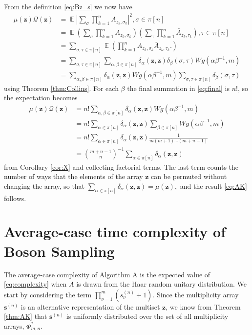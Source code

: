 \documentclass[a4paper,11pt]{article}
\newcommand{\EX}{\mathop{{}\mathbb{E}}}
\def\BS/{Boson Sampling}
\begin{document}
From the definition \eqref{eq:Bz_s} we now have
\begin{align}
	\mu(\mathbf{z}) \mathcal{Q}(\mathbf{z})
	&= \EX \left| \sum_{\sigma} \prod_{k=1}^n A_{z_k,\sigma_k}\right|^2, \sigma \in \pi[n] \nonumber\\
	&= \EX \left(\sum_\sigma \prod_{k=1}^n A_{z_k,\sigma_k }\right)\left(\sum_\tau \prod_{k=1}^n \bar{A}_{z_k,\tau_k}\right),\tau \in \pi[n] \nonumber\\
	&= \sum_{\sigma,\tau \in \pi[n]} \EX \left( \prod_{k=1}^n A_{z_k,\sigma_k} \bar{A}_{z_k,\tau_k}. \right)\nonumber\\ 
	&= \sum_{\sigma,\tau \in \pi[n]} \sum_{\alpha,\beta \in \pi[n]} 
	\delta_\alpha(\mathbf{z, z}) \delta_\beta(\sigma, \tau) W\!g(\alpha \beta^{-1},m)\nonumber \\
	\label{eq:final}
	&= \sum_{\alpha,\beta \in \pi[n]} \delta_\alpha(\mathbf{z, z}) W\!g(\alpha \beta^{-1},m) \sum_{\sigma,\tau \in \pi[n]} \delta_\beta(\sigma, \tau)
	\end{align}
	using Theorem \ref{thm:Collins}. For each $\beta$ the final summation in \eqref{eq:final} is $n!$, so the expectation becomes
	\begin{align} 
	\mu(\mathbf{z}) \mathcal{Q}(\mathbf{z})
	&= n! \sum_{\alpha,\beta \in \pi[n]} \delta_\alpha(\mathbf{z, z}) W\!g(\alpha \beta^{-1},m)\nonumber\\
	&= n! \sum_{\alpha \in \pi[n]} \delta_\alpha(\mathbf{z, z}) \sum_{\beta \in \pi[n]} W\!g(\alpha \beta^{-1},m)\nonumber\\
	&= n! \sum_{\alpha \in \pi[n]} \delta_\alpha(\mathbf{z, z}) \frac{1}{m(m+1)\cdots(m + n -1)}\nonumber\\
	&= \binom{m+n-1}{n}^{-1} \sum_{\alpha \in \pi[n]} \delta_\alpha(\mathbf{z, z})\nonumber
	\end{align}
	from Corollary \ref{cor:X} and collecting factorial terms. The last term counts the number of ways that the elements of the array $\mathbf{z}$ can be permuted without changing the array, so that  
	$\sum_{\alpha \in \pi[n]} \delta_\alpha(\mathbf{z, z}) = \mu(\mathbf{z}),$ and the result \eqref{eq:AK} follows.

\section{Average-case time complexity of \BS/}\label{sec:av-case}

The average-case complexity of Algorithm A is the expected value of \eqref{eq:complexity} when $A$ is drawn from the Haar random unitary distribution. We start by considering the term $\prod_{\nu=1}^m (s_\nu^{(n)} + 1)$. Since the multiplicity array 
$\mathbf{s}^{(n)}$ is an alternative representation of the multiset $\mathbf{z}$, we know from Theorem \ref{thm:AK} that $\mathbf{s}^{(n)}$ is uniformly distributed over the set of all multiplicity arrays, $\Phi_{m,n}^*$. 
\end{document}
